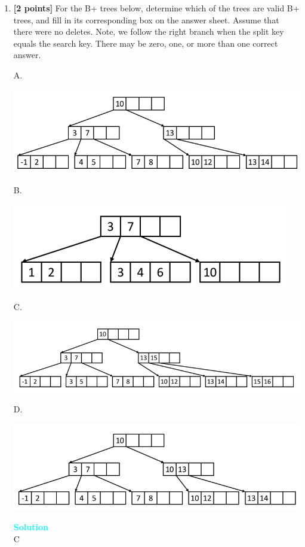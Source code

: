 \documentclass[10pt]{article}
\newenvironment{solution}
    { \begin{mdframed}[backgroundcolor=gray!10] \textcolor{cyan}{\textbf{Solution}} \\}
    {  \end{mdframed}}
\begin{document}
\begin{enumerate}

\item \textbf{[2 points]}
For the B+ trees below, determine which of the trees are valid B+ trees, and fill in its corresponding box on the answer sheet. 
Assume that there were no deletes. Note, we follow the right branch when the split key equals the search key. 
There may be zero, one, or more than one correct answer. 

A. 

\includegraphics[scale=0.4]{3.png} 

B. 

\includegraphics[scale=0.4]{1.png} 

C. 

\includegraphics[scale=0.4]{4.png} 

D. 

\includegraphics[scale=0.4]{2.png} 

\begin{solution}
C
\end{solution}



\end{enumerate}
\end{document}
